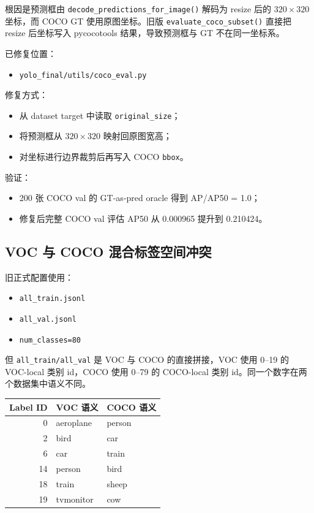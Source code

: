 \documentclass[UTF8]{ctexart}
\begin{document}
根因是预测框由 \texttt{decode\_predictions\_for\_image()} 解码为 resize 后的 $320\times320$ 坐标，而 COCO GT 使用原图坐标。旧版 \texttt{evaluate\_coco\_subset()} 直接把 resize 后坐标写入 pycocotools 结果，导致预测框与 GT 不在同一坐标系。

已修复位置：

\begin{itemize}[leftmargin=2em]
  \item \texttt{yolo\_final/utils/coco\_eval.py}
\end{itemize}

修复方式：

\begin{itemize}[leftmargin=2em]
  \item 从 dataset target 中读取 \texttt{original\_size}；
  \item 将预测框从 $320\times320$ 映射回原图宽高；
  \item 对坐标进行边界裁剪后再写入 COCO \texttt{bbox}。
\end{itemize}

验证：

\begin{itemize}[leftmargin=2em]
  \item 200 张 COCO val 的 GT-as-pred oracle 得到 AP/AP50 = 1.0；
  \item 修复后完整 COCO val 评估 AP50 从 0.000965 提升到 0.210424。
\end{itemize}

\subsection{VOC 与 COCO 混合标签空间冲突}

旧正式配置使用：

\begin{itemize}[leftmargin=2em]
  \item \texttt{all\_train.jsonl}
  \item \texttt{all\_val.jsonl}
  \item \texttt{num\_classes=80}
\end{itemize}

但 \texttt{all\_train/all\_val} 是 VOC 与 COCO 的直接拼接，VOC 使用 0--19 的 VOC-local 类别 id，COCO 使用 0--79 的 COCO-local 类别 id。同一个数字在两个数据集中语义不同。

\begin{center}
\begin{tabular}{rll}
\toprule
Label ID & VOC 语义 & COCO 语义 \\
\midrule
0 & aeroplane & person \\
2 & bird & car \\
6 & car & train \\
14 & person & bird \\
18 & train & sheep \\
19 & tvmonitor & cow \\
\bottomrule
\end{tabular}
\end{center}
\end{document}
